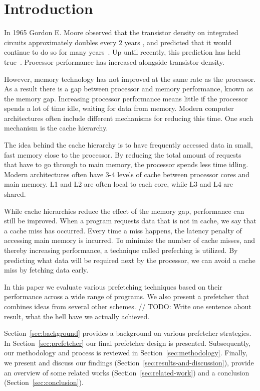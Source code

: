 \section{Introduction}
\label{sec:introduction}

In 1965 Gordon E. Moore observed that the transistor density on integrated circuits approximately doubles every 2 years ,
and predicted that it would continue to do so for many years~\cite{bib:moore}.
Up until recently, this prediction has held true~\cite{bib:moore-slowdown}.
Processor performance has increased alongside transistor density.

However, memory technology has not improved at the same rate as the processor.
As a result there is a gap between processor and memory performance, known as the memory gap.
Increasing processor performance means little if the processor spends a lot of time idle, waiting for data from memory.
Modern computer architectures often include different mechanisms for reducing this time.
One such mechanism is the cache hierarchy.

The idea behind the cache hierarchy is to have frequently accessed data in small, fast memory close to the processor.
By reducing the total amount of requests that have to go through to main memory, the processor spends less time idling.
Modern architectures often have 3-4 levels of cache between processor cores and main memory.
L1 and L2 are often local to each core, while L3 and L4 are shared.

While cache hierarchies reduce the effect of the memory gap, performance can still be improved.
When a program requests data that is not in cache, we say that a cache miss has occurred.
Every time a miss happens, the latency penalty of accessing main memory is incurred.
To minimize the number of cache misses, and thereby increasing performance, a technique called prefeching is utilized.
By predicting what data will be required next by the processor, we can avoid a cache miss by fetching data early.

In this paper we evaluate various prefetching techniques based on their performance across a wide range of programs.
We also present a prefetcher that combines ideas from several other schemes.
// TODO: Write one sentence about result, what the hell have we actually achieved.

Section~\ref{sec:background} provides a background on various prefetcher strategies.
In Section~\ref{sec:prefetcher} our final prefetcher design is presented.
Subsequently, our methodology and process is reviewed in Section~\ref{sec:methodology}.
Finally, we present and discuss our findings (Section~\ref{sec:results-and-discussion}), provide an overview of some related works (Section~\ref{sec:related-work}) and a conclusion (Section~\ref{sec:conclusion}).

